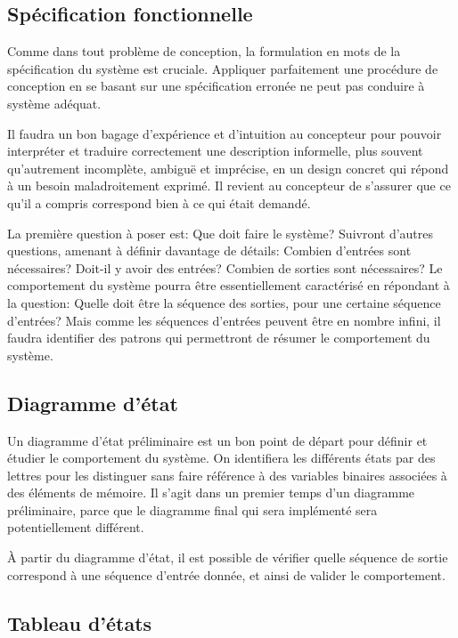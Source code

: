 \documentclass[11pt]{article}
\begin{document}
\subsection{Spécification fonctionnelle}
\label{sec:org199d8ac}

Comme dans tout problème de conception, la formulation en mots de la
spécification du système est cruciale. Appliquer parfaitement une
procédure de conception en se basant sur une spécification erronée ne
peut pas conduire à système adéquat.

Il faudra un bon bagage d'expérience et d'intuition au concepteur pour
pouvoir interpréter et traduire correctement une description
informelle, plus souvent qu'autrement incomplète, ambiguë et
imprécise, en un design concret qui répond à un besoin maladroitement
exprimé. Il revient au concepteur de s'assurer que ce qu'il a compris
correspond bien à ce qui était demandé.

La première question à poser est: Que doit faire le système? Suivront
d'autres questions, amenant à définir davantage de détails: Combien
d'entrées sont nécessaires? Doit-il y avoir des entrées? Combien de
sorties sont nécessaires? Le comportement du système pourra être
essentiellement caractérisé en répondant à la question: Quelle doit
être la séquence des sorties, pour une certaine séquence d'entrées?
Mais comme les séquences d'entrées peuvent être en nombre infini, il
faudra identifier des patrons qui permettront de résumer le
comportement du système.

\subsection{Diagramme d'état}
\label{sec:orgc57296c}

Un diagramme d'état préliminaire est un bon point de départ pour
définir et étudier le comportement du système. On identifiera les
différents états par des lettres pour les distinguer sans faire
référence à des variables binaires associées à des éléments de
mémoire. Il s'agit dans un premier temps d'un diagramme préliminaire,
parce que le diagramme final qui sera implémenté sera potentiellement
différent.

À partir du diagramme d'état, il est possible de vérifier quelle
séquence de sortie correspond à une séquence d'entrée donnée, et ainsi
de valider le comportement.

\subsection{Tableau d'états}
\label{sec:org88c7e87}
\end{document}
